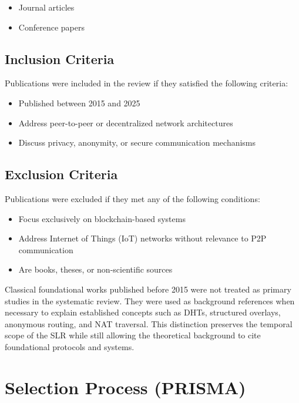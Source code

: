 \documentclass[
  12pt,
  oneside,
  a4paper,
  chapter=TITLE,
  section=TITLE,
  english,
  brazil
]{abntex2}
\begin{document}
\begin{itemize}
    \item Journal articles
    \item Conference papers
\end{itemize}

\section{Inclusion Criteria}

Publications were included in the review if they satisfied the following criteria:

\begin{itemize}
    \item Published between 2015 and 2025
    \item Address peer-to-peer or decentralized network architectures
    \item Discuss privacy, anonymity, or secure communication mechanisms
\end{itemize}

\section{Exclusion Criteria}

Publications were excluded if they met any of the following conditions:

\begin{itemize}
    \item Focus exclusively on blockchain-based systems
    \item Address Internet of Things (IoT) networks without relevance to P2P communication
    \item Are books, theses, or non-scientific sources
\end{itemize}

Classical foundational works published before 2015 were not treated as primary studies in the systematic review. They were used as background references when necessary to explain established concepts such as DHTs, structured overlays, anonymous routing, and NAT traversal. This distinction preserves the temporal scope of the SLR while still allowing the theoretical background to cite foundational protocols and systems.

\chapter{Selection Process (PRISMA)}
\end{document}
